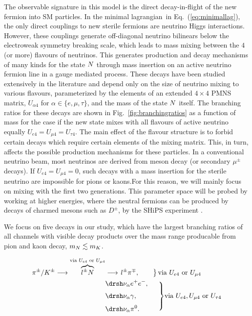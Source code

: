 \documentclass[11pt, a4paper]{article}
\newcommand{\refeq}[1]{Eq.~(\ref{#1})}
\newcommand{\reffig}[1]{Fig.~\ref{#1}}
\def\lagrangian{lagrangian}
\def\ster{\ensuremath N}
\begin{document}
The observable signature in this model is the direct decay-in-flight of the new
fermion into SM particles. In the minimal \lagrangian\ in
\refeq{eq:minimallag}, the only direct couplings to new sterile fermions are
neutrino Higgs interactions. However, these couplings generate off-diagonal
neutrino bilinears below the electroweak symmetry breaking scale, which leads
to mass mixing between the $4$ (or more) flavours of neutrinos. This generates
production and decay mechanisms of many kinds for the state $\ster$ through
mass insertion on an active neutrino fermion line in a gauge mediated process.
These decays have been studied extensively in the literature \cite{Atre:2009rg}
and depend only on the size of neutrino mixing to various flavours,
parameterized by the elements of an extended $4\times4$ PMNS matrix,
%
$U_{\alpha 4}$ for $\alpha \in \{e,\mu,\tau\}$, 
%
and the mass of the state $\ster$ itself. The branching ratios for these decays
are shown in \reffig{fig:branchingratios} as a function of mass for the case if
the new state mixes with all flavours of active neutrino equally $U_{e4}=U_{\mu
4}=U_{\tau 4}$. The main effect of the flavour structure is to forbid certain
decays which require certain elements of the mixing matrix. This, in turn,
affects the possible production mechanisms for these particles. In a
conventional neutrino beam, most neutrinos are derived from meson decay (or
secondary $\mu^\pm$ decays). If $U_{e4}=U_{\mu 4}=0$, such decays with a mass
insertion for the sterile neutrino are impossible for pions or kaons.For this
reason, we will mainly focus on mixing with the first two generations. This
parameter space will be probed by working at higher energies, where the neutral
fermions can be produced by decays of charmed mesons such as $D^\pm$, by the
SHiPS experiment \cite{Alekhin:2015byh, Anelli:2015pba}.   

We focus on five decays in our study, which have the largest branching ratios
of all channels with visible decay products over the mass range producable from
pion and kaon decay, $m_{\ster} \lesssim m_K$.

\begin{align*}
\pi^\pm / K^\pm \longrightarrow \overbrace{l^\pm \ster}^{\text{via } U_{e4} \text{ or } U_{\mu 4}}  &\longrightarrow \left. l^\pm \pi^\mp, \qquad \right\} \text{via } U_{e4} \text{ or } U_{\mu 4}\\
														    & \drsh \nu_\alpha e^+ e^-,\\[\jot]
					   & \drsh \nu_\alpha \gamma, \hspace*{3em}
		\smash{\left.\begin{array}{@{}c@{}}\\[\jot]\\[\jot]\\[\jot]\end{array}\right\}}\text{via } U_{e4}, U_{\mu 4} \text{  or  } U_{\tau 4}\\[\jot]
						& \drsh \nu_\alpha \pi^0.
\end{align*}
\end{document}
